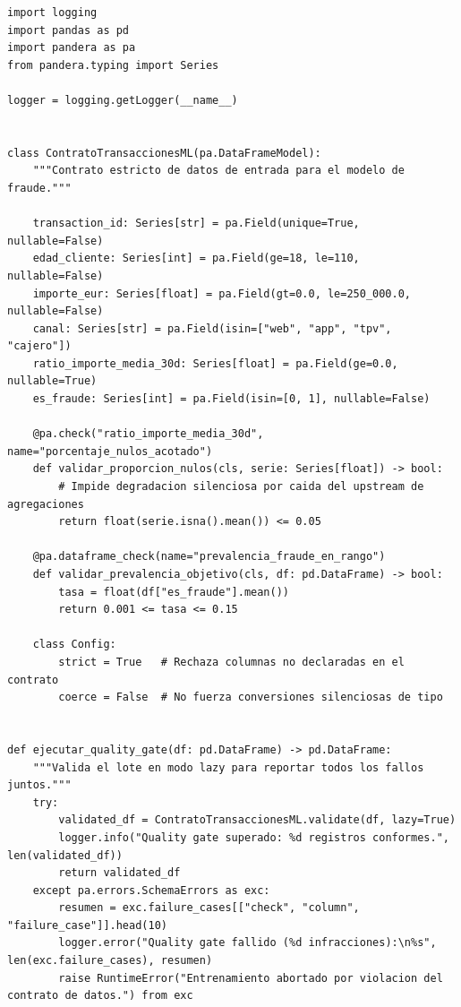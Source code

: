 \begin{lstlisting}[style=python, caption={Quality gate declarativo con Pandera para validar esquemas, distribuciones e invariantes de negocio antes del entrenamiento.}, label={lst:pandera-quality-gate}]
import logging
import pandas as pd
import pandera as pa
from pandera.typing import Series

logger = logging.getLogger(__name__)


class ContratoTransaccionesML(pa.DataFrameModel):
    """Contrato estricto de datos de entrada para el modelo de fraude."""

    transaction_id: Series[str] = pa.Field(unique=True, nullable=False)
    edad_cliente: Series[int] = pa.Field(ge=18, le=110, nullable=False)
    importe_eur: Series[float] = pa.Field(gt=0.0, le=250_000.0, nullable=False)
    canal: Series[str] = pa.Field(isin=["web", "app", "tpv", "cajero"])
    ratio_importe_media_30d: Series[float] = pa.Field(ge=0.0, nullable=True)
    es_fraude: Series[int] = pa.Field(isin=[0, 1], nullable=False)

    @pa.check("ratio_importe_media_30d", name="porcentaje_nulos_acotado")
    def validar_proporcion_nulos(cls, serie: Series[float]) -> bool:
        # Impide degradacion silenciosa por caida del upstream de agregaciones
        return float(serie.isna().mean()) <= 0.05

    @pa.dataframe_check(name="prevalencia_fraude_en_rango")
    def validar_prevalencia_objetivo(cls, df: pd.DataFrame) -> bool:
        tasa = float(df["es_fraude"].mean())
        return 0.001 <= tasa <= 0.15

    class Config:
        strict = True   # Rechaza columnas no declaradas en el contrato
        coerce = False  # No fuerza conversiones silenciosas de tipo


def ejecutar_quality_gate(df: pd.DataFrame) -> pd.DataFrame:
    """Valida el lote en modo lazy para reportar todos los fallos juntos."""
    try:
        validated_df = ContratoTransaccionesML.validate(df, lazy=True)
        logger.info("Quality gate superado: %d registros conformes.", len(validated_df))
        return validated_df
    except pa.errors.SchemaErrors as exc:
        resumen = exc.failure_cases[["check", "column", "failure_case"]].head(10)
        logger.error("Quality gate fallido (%d infracciones):\n%s", len(exc.failure_cases), resumen)
        raise RuntimeError("Entrenamiento abortado por violacion del contrato de datos.") from exc
\end{lstlisting}

